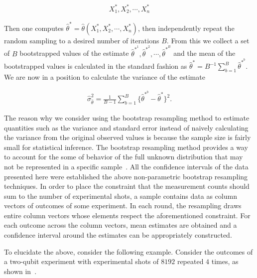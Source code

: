 \begin{align}
    X_1^{*}, X_2^{*}, \cdots , X_n^{*}
\end{align}

\noindent
Then one computes $\hat{\theta}^{*} = \hat{\theta}(X_1^{*}, X_2^{*}, \cdots, X_n^{*})$, then independently repeat the random sampling to a desired number of iterations $B$. From this we collect a set of $B$ bootstrapped values of the estimate $\hat{\theta}^{*^1},\hat{\theta}^{*^2}, \cdots, \hat{\theta}^{*^B}$ and the mean of the bootstrapped values is calculated in the standard fashion as  $\hat{\theta}^{*} = B^{-1}\sum_{b=1}^B \hat{\theta}^{*^b}$. We are now in a position to calculate the variance of the estimate

\begin{align}
    \hat{\sigma}^2_{\hat{\theta}} = \frac{1}{B-1} \displaystyle\sum_{b=1}^{B}\{\hat{\theta}^{*^b}  -
\hat{\theta}^{*} \}^2.
\end{align}

\noindent
The reason why we consider using the bootstrap resampling method to estimate quantities such as the variance and standard error instead of naively calculating the variance from the original observed values is because the sample size is fairly small for statistical inference. The bootstrap resampling method provides a way to account for the some of behavior of the full unknown distribution that may not be represented in a specific sample~\cite{Efron_1979,Efron_1982}. All the confidence intervals of the data presented here were established \via the above non-parametric bootstrap resampling techniques. In order to place the constraint that the measurement counts should sum to the number of experimental shots, a sample contains data as column vectors of outcomes of some experiment. In each round, the resampling draws entire column vectors whose elements respect the aforementioned constraint. For each outcome across the column vectors, mean estimates are obtained and a confidence interval around the estimates can be appropriately constructed. 

\bigskip
\noindent
To elucidate the above, consider the following example. Consider the outcomes of a two-qubit experiment with experimental shots of $8192$ repeated $4$ times, as shown in~.

\clearpage

